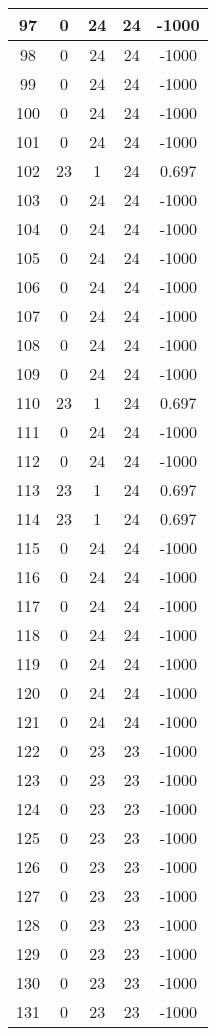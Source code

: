 \documentclass[letterpaper, 12pt]{article}
\begin{document}
\begin{longtable}{|c|c|c|c|c|}
\hline
97 & 0 & 24 & 24 & -1000 \\
\hline
98 & 0 & 24 & 24 & -1000 \\
\hline
99 & 0 & 24 & 24 & -1000 \\
\hline
100 & 0 & 24 & 24 & -1000 \\
\hline
101 & 0 & 24 & 24 & -1000 \\
\hline
102 & 23 & 1 & 24 & 0.697 \\
\hline
103 & 0 & 24 & 24 & -1000 \\
\hline
104 & 0 & 24 & 24 & -1000 \\
\hline
105 & 0 & 24 & 24 & -1000 \\
\hline
106 & 0 & 24 & 24 & -1000 \\
\hline
107 & 0 & 24 & 24 & -1000 \\
\hline
108 & 0 & 24 & 24 & -1000 \\
\hline
109 & 0 & 24 & 24 & -1000 \\
\hline
110 & 23 & 1 & 24 & 0.697 \\
\hline
111 & 0 & 24 & 24 & -1000 \\
\hline
112 & 0 & 24 & 24 & -1000 \\
\hline
113 & 23 & 1 & 24 & 0.697 \\
\hline
114 & 23 & 1 & 24 & 0.697 \\
\hline
115 & 0 & 24 & 24 & -1000 \\
\hline
116 & 0 & 24 & 24 & -1000 \\
\hline
117 & 0 & 24 & 24 & -1000 \\
\hline
118 & 0 & 24 & 24 & -1000 \\
\hline
119 & 0 & 24 & 24 & -1000 \\
\hline
120 & 0 & 24 & 24 & -1000 \\
\hline
121 & 0 & 24 & 24 & -1000 \\
\hline
122 & 0 & 23 & 23 & -1000 \\
\hline
123 & 0 & 23 & 23 & -1000 \\
\hline
124 & 0 & 23 & 23 & -1000 \\
\hline
125 & 0 & 23 & 23 & -1000 \\
\hline
126 & 0 & 23 & 23 & -1000 \\
\hline
127 & 0 & 23 & 23 & -1000 \\
\hline
128 & 0 & 23 & 23 & -1000 \\
\hline
129 & 0 & 23 & 23 & -1000 \\
\hline
130 & 0 & 23 & 23 & -1000 \\
\hline
131 & 0 & 23 & 23 & -1000 \\

\end{longtable}
\end{document}
